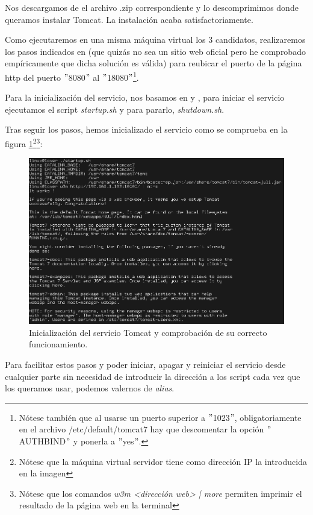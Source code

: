 \documentclass[a4paper, 10pt]{article}
\begin{document}
		Nos descargamos de \cite{TC_download} el archivo .zip correspondiente y lo descomprimimos
		donde queramos instalar Tomcat. La instalación acaba satisfactoriamente.
		
		Como ejecutaremos en una misma máquina virtual los 3 candidatos, realizaremos los pasos
		indicados en \cite{TC_StackOverFlow}(que quizás no sea un sitio web oficial pero he comprobado
		empíricamente que dicha solución es válida) para reubicar el puerto de la página http del
		puerto $"$8080$"$ al $"$18080$"$\footnote{Nótese también que al usarse un puerto superior a
		$"$1023$"$, obligatoriamente en el archivo /etc/default/tomcat7 hay que descomentar la opción
		$"$AUTHBIND$"$ y ponerla a $"$yes$"$.}.
		
		Para la inicialización del servicio, nos basamos en \cite{TC_install} y \cite{TC_config},
		para iniciar el servicio ejecutamos el script \textit{startup.sh} y para pararlo,
		\textit{shutdown.sh}.
		
		Tras seguir los pasos, hemos inicializado el servicio como se comprueba en la figura
		\ref{fig:TC_Success}\footnote{Nótese que la máquina virtual servidor tiene como dirección IP
		la introducida en la imagen}\footnote{Nótese que los comandos \textit{w3m <dirección web> |
		more} permiten imprimir el resultado de la página web en la terminal}:
		
		\begin{figure}[h!]
			\includegraphics[width=15cm]{Success_TC.png}
			\caption{Inicialización del servicio Tomcat y comprobación de su correcto funcionamiento.}
			\label{fig:TC_Success}
		\end{figure}

		Para facilitar estos pasos y poder iniciar, apagar y reiniciar el servicio desde cualquier
		parte sin necesidad de introducir la dirección a los script cada vez que los queramos usar,
		podemos valernos de \textit{alias}.
		
\end{document}
